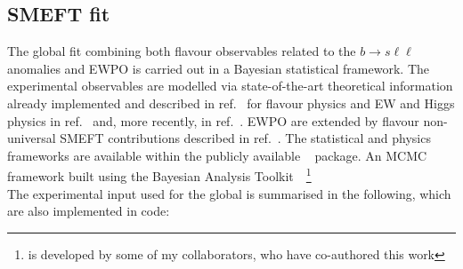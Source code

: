 \subsection{SMEFT fit}
\label{sec:strategy}
The global fit combining both flavour observables related to the $ b \to s \ell \ell$ anomalies and EWPO is carried out in a Bayesian statistical framework. The experimental observables are modelled via state-of-the-art theoretical information already implemented and described in ref.~\cite{Ciuchini:2019usw} for flavour physics and EW and Higgs physics in ref.~\cite{Ciuchini:2013pca} and, more recently, in ref.~\cite{deBlas:2016ojx}. EWPO are extended by flavour non-universal  SMEFT contributions described in ref.~\cite{Efrati:2015eaa,deBlas:2019wgy}. The statistical and physics frameworks are available within the publicly available \HEPfit~\cite{deBlas:2019okz} package. An MCMC framework built using the Bayesian Analysis Toolkit~\cite{2009CoPhC.180.2197C}~\footnote{ \HEPfit is developed by some of my collaborators, who have co-authored this work}\\
The experimental input used for the global is summarised in the following, which are also implemented in \HEPfit code: 
